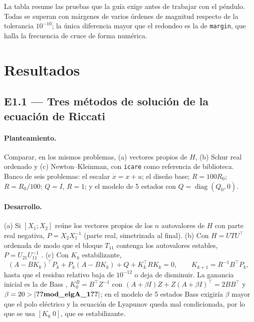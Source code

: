 \documentclass[11pt,a4paper]{article}
\begin{document}

La tabla resume las pruebas que la guía exige antes de trabajar con el péndulo. Todas se superan con
márgenes de varios órdenes de magnitud respecto de la tolerancia $10^{-10}$; la única diferencia mayor que el
redondeo es la de \texttt{margin}, que halla la frecuencia de cruce de forma numérica.

\section{Resultados}

\subsection{E1.1 --- Tres métodos de solución de la ecuación de Riccati}
\paragraph{Planteamiento.} Comparar, en los mismos problemas, (a) vectores propios de $H$, (b) Schur real
ordenado y (c) Newton--Kleinman, con \texttt{icare} como referencia de biblioteca. Banco de seis problemas: el
escalar $\dot x=x+u$; el diseño base; $R=100R_0$; $R=R_0/100$; $Q=I$, $R=1$; y el modelo de 5 estados con
$Q=\operatorname{diag}(Q_0,0)$.

\paragraph{Desarrollo.} (a) Si $[X_1;X_2]$ reúne los vectores propios de los $n$ autovalores de $H$ con parte real
negativa, $P=X_2X_1^{-1}$ (parte real, simetrizada al final). (b) Con $H=UTU^\top$ ordenada de modo que el bloque
$T_{11}$ contenga los autovalores estables, $P=U_{21}U_{11}^{-1}$ \cite{laub1979}. (c) Con $K_k$ estabilizante,
\begin{equation}
(A-BK_k)^\top P_k+P_k(A-BK_k)+Q+K_k^\top RK_k=0,\qquad K_{k+1}=R^{-1}B^\top P_k ,
\end{equation}
hasta que el residuo relativo baja de $10^{-12}$ o deja de disminuir. La ganancia inicial es la de Bass
\cite{armstrong1975}, $K_0^{B}=B^\top Z^{-1}$ con $(A+\beta I)Z+Z(A+\beta I)^\top=2BB^\top$ y $\beta=20>|\V{mod_eigA_1}|$; en el
modelo de 5 estados Bass exigiría $\beta$ mayor que el polo eléctrico y la ecuación de Lyapunov queda mal
condicionada, por lo que se usa $[K_0\;0]$, que es estabilizante.
\end{document}
